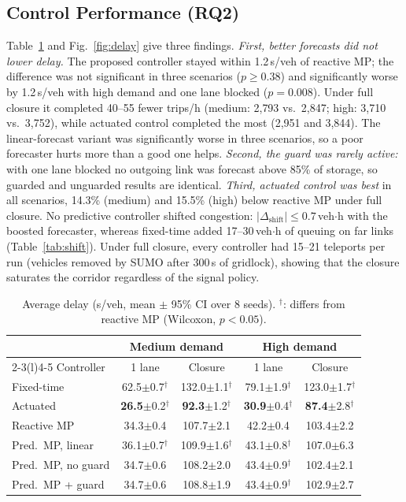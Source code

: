 \documentclass[conference]{IEEEtran}
\begin{document}
\subsection{Control Performance (RQ2)}

Table~\ref{tab:ctl} and Fig.~\ref{fig:delay} give three findings. \emph{First, better forecasts did not lower delay.} The proposed controller stayed within 1.2\,s/veh of reactive MP; the difference was not significant in three scenarios ($p\geq0.38$) and significantly worse by 1.2\,s/veh with high demand and one lane blocked ($p=0.008$). Under full closure it completed 40--55 fewer trips/h (medium: 2{,}793 vs.\ 2{,}847; high: 3{,}710 vs.\ 3{,}752), while actuated control completed the most (2{,}951 and 3{,}844). The linear-forecast variant was significantly worse in three scenarios, so a poor forecaster hurts more than a good one helps. \emph{Second, the guard was rarely active:} with one lane blocked no outgoing link was forecast above 85\% of storage, so guarded and unguarded results are identical. \emph{Third, actuated control was best} in all scenarios, 14.3\% (medium) and 15.5\% (high) below reactive MP under full closure. No predictive controller shifted congestion: $|\Delta_{\text{shift}}|\leq0.7$\,veh$\cdot$h with the boosted forecaster, whereas fixed-time added 17--30\,veh$\cdot$h of queuing on far links (Table~\ref{tab:shift}). Under full closure, every controller had 15--21 teleports per run (vehicles removed by SUMO after 300\,s of gridlock), showing that the closure saturates the corridor regardless of the signal policy.

\begin{table}[!htbp]
\centering
\caption{Average delay (s/veh, mean $\pm$ 95\% CI over 8 seeds). $^{\dagger}$: differs from reactive MP (Wilcoxon, $p<0.05$).}
\label{tab:ctl}
\footnotesize
\setlength{\tabcolsep}{2pt}
\begin{tabular}{@{}lcccc@{}}
\toprule
 & \multicolumn{2}{c}{Medium demand} & \multicolumn{2}{c}{High demand} \\
\cmidrule(lr){2-3}\cmidrule(l){4-5}
Controller & 1 lane & Closure & 1 lane & Closure \\
\midrule
Fixed-time & 62.5$\pm$0.7$^{\dagger}$ & 132.0$\pm$1.1$^{\dagger}$ & 79.1$\pm$1.9$^{\dagger}$ & 123.0$\pm$1.7$^{\dagger}$ \\
Actuated & \textbf{26.5}$\pm$0.2$^{\dagger}$ & \textbf{92.3}$\pm$1.2$^{\dagger}$ & \textbf{30.9}$\pm$0.4$^{\dagger}$ & \textbf{87.4}$\pm$2.8$^{\dagger}$ \\
Reactive MP & 34.3$\pm$0.4 & 107.7$\pm$2.1 & 42.2$\pm$0.4 & 103.4$\pm$2.2 \\
Pred.\ MP, linear & 36.1$\pm$0.7$^{\dagger}$ & 109.9$\pm$1.6$^{\dagger}$ & 43.1$\pm$0.8$^{\dagger}$ & 107.0$\pm$6.3 \\
Pred.\ MP, no guard & 34.7$\pm$0.6 & 108.2$\pm$2.0 & 43.4$\pm$0.9$^{\dagger}$ & 102.4$\pm$2.1 \\
Pred.\ MP + guard & 34.7$\pm$0.6 & 108.8$\pm$1.9 & 43.4$\pm$0.9$^{\dagger}$ & 102.9$\pm$2.7 \\
\bottomrule
\end{tabular}
\end{table}
\end{document}
